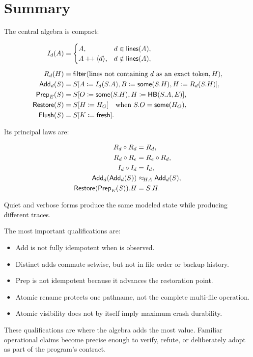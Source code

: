 \section{Summary}

The central algebra is compact:

\begin{align*}
I_{d}(A)
  &= \begin{cases}
       A, & d\in\mathsf{lines}(A),\\
       A\mathbin{+\!+}\langle d\rangle, & d\notin\mathsf{lines}(A),
     \end{cases}\\[0.5em]
R_{d}(H)
  &= \mathsf{filter}(\text{lines not containing }d\text{ as an exact token},H),\\
\mathsf{Add}_{d}(S)
  &= S[A\coloneqq I_{d}(S.A),
       B\coloneqq\mathsf{some}(S.H),
       H\coloneqq R_{d}(S.H)],\\
\mathsf{Prep}_E(S)
  &= S[O\coloneqq\mathsf{some}(S.H),H\coloneqq\mathsf{HB}(S.A,E)],\\
\mathsf{Restore}(S)
  &= S[H\coloneqq H_O]\quad\text{when }S.O=\mathsf{some}(H_O),\\
\mathsf{Flush}(S)
  &= S[K\coloneqq\mathsf{fresh}].
\end{align*}

Its principal laws are:

\begin{align*}
R_{d}\circ R_{d} &= R_{d},\\
R_{d}\circ R_{e} &= R_{e}\circ R_{d},\\
I_{d}\circ I_{d} &= I_{d},\\
\mathsf{Add}_{d}(\mathsf{Add}_{d}(S)) &\mathrel{\approx_{\!HA}}\mathsf{Add}_{d}(S),\\
\mathsf{Restore}(\mathsf{Prep}_E(S)).H &= S.H.
\end{align*}

Quiet and verbose forms produce the same modeled state while producing
different traces.

The most important qualifications are:

\begin{itemize}
  \item Add is not fully idempotent when  is observed.
  \item Distinct adds commute setwise, but not in file order or backup history.
  \item Prep is not idempotent because it advances the restoration point.
  \item Atomic rename protects one pathname, not the complete multi-file
        operation.
  \item Atomic visibility does not by itself imply maximum crash durability.
\end{itemize}

These qualifications are where the algebra adds the most value.  Familiar
operational claims become precise enough to verify, refute, or deliberately
adopt as part of the program's contract.
